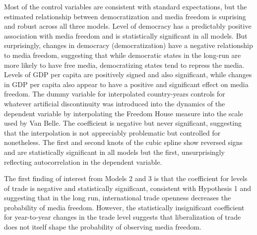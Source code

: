 \documentclass[12pt,a4paper]{article}\usepackage[]{graphicx}\usepackage[]{color}
\begin{document}
Most of the control variables are consistent with standard expectations, but the estimated relationship between democratization and media freedom is suprising and robust across all three models. Level of democracy has a predictably positive association with media freedom and is statistically significant in all models. But surprisingly, changes in democracy (democratization) have a negative relationship to media freedom, suggesting that while democratic states in the long-run are more likely to have free media, democratizing states tend to repress the media. Levels of GDP per capita are positively signed and also significant, while changes in GDP per capita also appear to have a positive and significant effect on media freedom. The dummy variable for interpolated country-years controls for whatever artificial discontinuity was introduced into the dynamics of the dependent variable by interpolating the Freedom House measure into the scale used by Van Belle. The coefficient is negative but never significant, suggesting that the interpolation is not appreciably problematic but controlled for nonetheless. The first and second knots of the cubic spline show reversed signs and are statistically significant in all models but the first, unsurprisingly reflecting autocorrelation in the dependent variable.

The first finding of interest from Models 2 and 3 is that the coefficient for levels of trade is negative and statistically significant, consistent with Hypothesis 1 and suggesting that in the long run, international trade openness decreases the probability of media freedom. However, the statistically insignificant coefficient for year-to-year changes in the trade level suggests that liberalization of trade does not itself shape the probability of observing media freedom.
\end{document}
